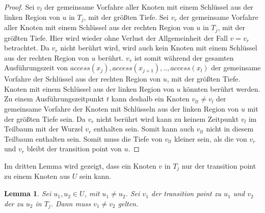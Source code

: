 \documentclass[a4paper,12pt]{article}
\newtheorem{Lemma}{Lemma}[section]
\begin{document}
\begin{proof}
	Sei $v_l$ der gemeinsame Vorfahre aller Knoten mit einem Schlüssel aus der linken Region von $u$ in $T_j$, mit der größten Tiefe. Sei $v_r$ der gemeinsame Vorfahre aller Knoten mit einem Schlüssel aus der rechten Region von $u$ in $T_j$, mit der größten Tiefe. Hier wird wieder ohne Verlust der Allgemeinheit der Fall $v = v_r$ betrachtet. Da $v_r$ nicht berührt wird, wird auch kein Knoten mit einem Schlüssel aus der rechten Region von $u$ berührt. $v_r$ ist somit während der gesamten Ausführungszeit von $\textit{access}\left(x_j\right),\textit{access}\left(x_{j+1}\right),..,\textit{access}\left(x_l\right)$  der gemeinsame Vorfahre der Schlüssel aus der rechten Region von $u$, mit der größten Tiefe. Knoten mit einem Schlüssel aus der linken Region von $u$ könnten berührt werden. Zu einem Ausführungszeitpunkt $t$ kann deshalb ein Knoten $v_{lt} \ne v_l$ der gemeinsame Vorfahre der Knoten mit Schlüsseln aus der linken Region von $u$ mit der größten Tiefe sein. Da $v_r$ nicht berührt wird kann zu keinem Zeitpunkt $v_l$ im Teilbaum mit der Wurzel $v_r$ enthalten sein. Somit kann auch $v_{lt}$ nicht in diesem Teilbaum enthalten sein. Somit muss die Tiefe von  $v_{lt}$ kleiner sein, als die von $v_r$ und $v_r$ bleibt der transition point von $u$. 
\end{proof}

\noindent Im dritten Lemma wird gezeigt, dass ein Knoten $v$ in $T_j$ nur der transition point zu einem Knoten aus $U$ sein kann.


\begin{Lemma}\label{lemmaDemaine3}
	Sei $u_1, u_2 \in U$, mit $u_1 \ne u_2$.  Sei $v_1$ der transition point zu $u_1$ und $v_2$ der zu $u_2$ in $T_j$. Dann muss $v_1 \neq v_2$ gelten.
\end{Lemma}
\end{document}
